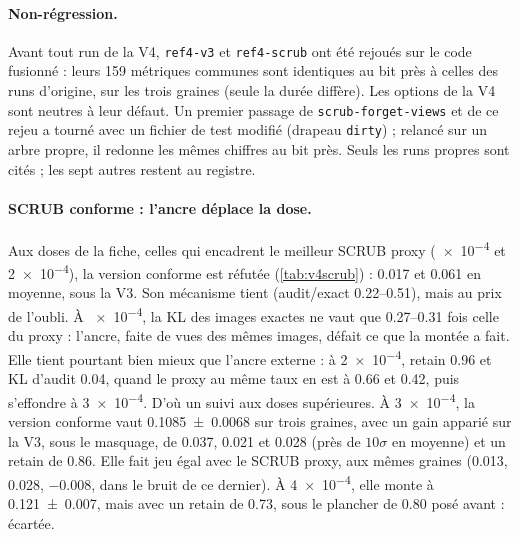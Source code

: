 \documentclass[11pt,a4paper]{article}
\newcommand{\code}[1]{\texttt{#1}}
\begin{document}
\paragraph{Non-régression.} Avant tout run de la V4, \code{ref4-v3} et \code{ref4-scrub} ont été
rejoués sur le code fusionné : leurs 159 métriques communes sont identiques au bit près à celles
des runs d'origine, sur les trois graines (seule la durée diffère). Les options de la V4 sont
neutres à leur défaut. Un premier passage de \code{scrub-forget-views} et de ce rejeu a tourné avec
un fichier de test modifié (drapeau \code{dirty}) ; relancé sur un arbre propre, il redonne les
mêmes chiffres au bit près. Seuls les runs propres sont cités ; les sept autres restent au registre.

\paragraph{SCRUB conforme : l'ancre déplace la dose.} Aux doses de la fiche, celles qui encadrent le
meilleur SCRUB proxy (\num{e-4} et \num{2e-4}), la version conforme est réfutée
(\cref{tab:v4scrub}) : \num{0.017} et \num{0.061} en moyenne, sous la V3. Son mécanisme tient
(audit/exact \numrange{0.22}{0.51}), mais au prix de l'oubli. À \num{e-4}, la KL des images exactes
ne vaut que \numrange{0.27}{0.31} fois celle du proxy : l'ancre, faite de vues des mêmes images,
défait ce que la montée a fait. Elle tient pourtant bien mieux que l'ancre externe : à \num{2e-4},
retain \num{0.96} et KL d'audit \num{0.04}, quand le proxy au même taux en est à \num{0.66} et
\num{0.42}, puis s'effondre à \num{3e-4}. D'où un suivi aux doses supérieures. À \num{3e-4}, la
version conforme vaut \num{0.1085 +- 0.0068} sur trois graines, avec un gain apparié sur la V3, sous
le masquage, de \num{+0.037}, \num{+0.021} et \num{+0.028} (près de $10\sigma$ en moyenne) et un
retain de \num{0.86}. Elle fait jeu égal avec le SCRUB proxy, aux mêmes graines (\num{+0.013},
\num{+0.028}, \num{-0.008}, dans le bruit de ce dernier). À \num{4e-4}, elle monte à
\num{0.121 +- 0.007}, mais avec un retain de \num{0.73}, sous le plancher de \num{0.80} posé avant :
écartée.
\end{document}

